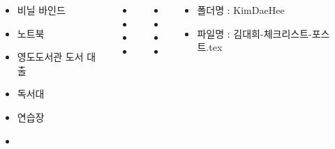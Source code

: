 \documentclass[	20pt, 
							a1paper, 
							portrait, %
							margin=0mm, %
							innermargin=10mm,  		%
							blockverticalspace=4mm, %
							colspace=5mm, 
							subcolspace=0mm
							]{tikzposter}
\begin{document}
\begin{columns}
			{
				\begin{LARGE}
					\begin{itemize}
					\item 비닐 바인드
					\item 노트북
					\item 영도도서관 도서 대출
					\item 독서대
					\item 연습장
					\item 

					\end{itemize}
				\end{LARGE}
			}



			{
				\begin{LARGE}
					\begin{itemize}
					\item 
					\item 
					\item 
					\item 
					\end{itemize}
				\end{LARGE}
			}


			{
				\begin{LARGE}
					\begin{itemize}
					\item 
					\item 
					\item 
					\item 
					\end{itemize}
				\end{LARGE}
			}




			{
				\begin{LARGE}
					\begin{itemize}
					\item 폴더명 : KimDaeHee
					\item 파일명 : 김대희-체크리스트-포스트.tex
					\end{itemize}
				\end{LARGE}
			}



	\end{columns}
\end{document}

